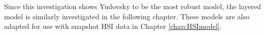 Since this investigation shows Yudovsky to be the most robust model, the layered model is similarly investigated in the following chapter. These models are also adapted for use with snapshot HSI data in Chapter \ref{chap:HSImodel}. 





% 

% 

% 
